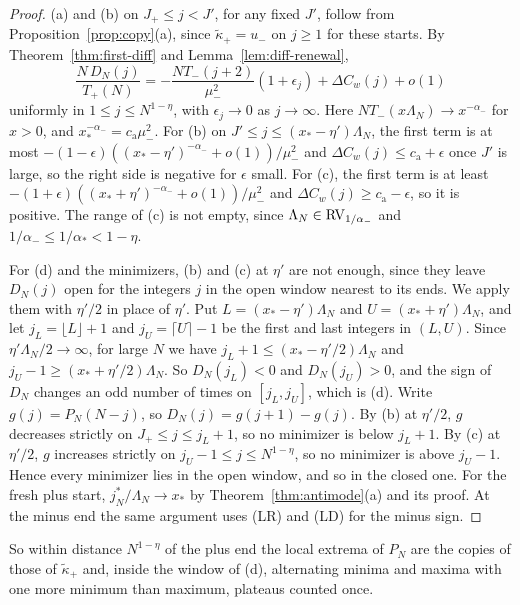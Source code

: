 \begin{proof}
(a) and (b) on $J_\plus\le j<J'$, for any fixed $J'$, follow from
Proposition~\ref{prop:copy}(a), since $\widetilde\kappa_\plus=u_\minus$ on $j\ge1$ for these
starts. By Theorem~\ref{thm:first-diff} and Lemma~\ref{lem:diff-renewal},
\[
 \frac{N\,D_N(j)}{T_\plus(N)}=-\frac{NT_\minus(j+2)}{\mu_\minus^2}(1+\epsilon_j)+\Delta C_w(j)+o(1)
\]
uniformly in $1\le j\le N^{1-\eta}$, with $\epsilon_j\to0$ as $j\to\infty$. Here
$NT_\minus(x\Lambda_N)\to x^{-\alpha_\minus}$ for $x>0$, and
$x_*^{-\alpha_\minus}=c_{\mathrm a}\mu_\minus^2$. For (b) on $J'\le j\le(x_*-\eta')\Lambda_N$, the
first term is at most $-(1-\epsilon)((x_*-\eta')^{-\alpha_\minus}+o(1))/\mu_\minus^2$ and
$\Delta C_w(j)\le c_{\mathrm a}+\epsilon$ once $J'$ is large, so the right side is negative for
$\epsilon$ small. For (c), the first term is at least
$-(1+\epsilon)((x_*+\eta')^{-\alpha_\minus}+o(1))/\mu_\minus^2$ and
$\Delta C_w(j)\ge c_{\mathrm a}-\epsilon$, so it is positive. The range of (c) is not empty,
since $\Lambda_N\in\mathrm{RV}_{1/\alpha_{-}}$ and $1/\alpha_\minus\le1/\alpha_*<1-\eta$.

For (d) and the minimizers, (b) and (c) at $\eta'$ are not enough, since they leave
$D_N(j)$ open for the integers $j$ in the open window nearest to its ends. We apply them
with $\eta'/2$ in place of $\eta'$. Put $L=(x_*-\eta')\Lambda_N$ and $U=(x_*+\eta')\Lambda_N$,
and let $j_L=\lfloor L\rfloor+1$ and $j_U=\lceil U\rceil-1$ be the first and last integers in
$(L,U)$. Since $\eta'\Lambda_N/2\to\infty$, for large $N$ we have
$j_L+1\le(x_*-\eta'/2)\Lambda_N$ and $j_U-1\ge(x_*+\eta'/2)\Lambda_N$. So $D_N(j_L)<0$ and
$D_N(j_U)>0$, and the sign of $D_N$ changes an odd number of times on $[j_L,j_U]$, which is
(d). Write $g(j)=P_N(N-j)$, so $D_N(j)=g(j+1)-g(j)$. By (b) at $\eta'/2$, $g$ decreases
strictly on $J_\plus\le j\le j_L+1$, so no minimizer is below $j_L+1$. By (c) at
$\eta'/2$, $g$ increases strictly on $j_U-1\le j\le N^{1-\eta}$, so no minimizer is above
$j_U-1$. Hence every minimizer lies in the open window, and so in the closed one. For the
fresh plus start, $j^*_N/\Lambda_N\to x_*$ by
Theorem~\ref{thm:antimode}(a) and its proof. At the minus end the same argument uses (LR) and
(LD) for the minus sign.
\end{proof}

So within distance $N^{1-\eta}$ of the plus end the local extrema of $P_N$ are the copies of
those of $\widetilde\kappa_\plus$ and, inside the window of (d), alternating minima and
maxima with one more minimum than maximum, plateaus counted once.

